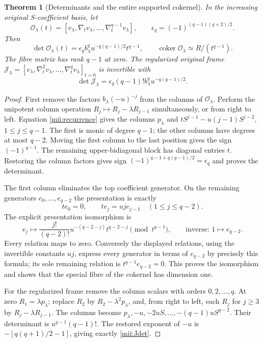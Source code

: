 \documentclass[11pt]{article}
\newtheorem{theorem}{Theorem}
\newcommand{\coker}{\operatorname{coker}}
\begin{document}
\begin{theorem}[Determinants and the entire supported cokernel]
In the increasing original $S$-coefficient basis, let
\[
 \mathcal O_\lambda(t)=[v_\lambda,\nabla_t v_\lambda,
                  \ldots,\nabla_t^{q-1}v_\lambda],
 \qquad\epsilon_q=(-1)^{(q-1)(q+2)/2}.
\]
Then
\begin{equation}\tag{MII19}\label{mii:Odet}
 \det\mathcal O_\lambda(t)
   =\epsilon_q b_\lambda^q u^{-q(q-1)/2}t^{q-1},
 \qquad\coker\mathcal O_\lambda\simeq R/(t^{q-1}).
\end{equation}
The fibre matrix has rank $q-1$ at zero. The regularized original
frame
$\mathcal J_\lambda=[v_\lambda,\nabla_t^2v_\lambda,
\ldots,\nabla_t^qv_\lambda]_{t=0}$ is invertible with
\begin{equation}\tag{MII20}\label{mii:Jdet}
 \det\mathcal J_\lambda
    =\epsilon_q(q-1)!b_\lambda^q u^{-q(q-1)/2}.
\end{equation}
\end{theorem}
\begin{proof}
First remove the factors $b_\lambda(-u)^{-j}$ from the columns
of $\mathcal O_\lambda$. Perform the unipotent column operation
$R_j\mapsto R_j-\lambda R_{j-1}$ simultaneously, or from right
to left. Equation \eqref{mii:recurrence} gives the columns
$p_\lambda$ and $tS^{j-1}-u(j-1)S^{j-2}$, $1\le j\le q-1$.
The first is monic of degree $q-1$; the other columns have degrees
at most $q-2$. Moving the first column to the last position gives
the sign $(-1)^{q-1}$. The remaining upper-bidiagonal block has
diagonal entries $t$. Restoring the column factors gives sign
$(-1)^{q-1+q(q-1)/2}=\epsilon_q$ and proves the determinant.

The first column eliminates the top coefficient generator. On the
remaining generators $e_0,\ldots,e_{q-2}$ the presentation is exactly
\[
 te_0=0,\qquad te_j=u j e_{j-1}\quad(1\le j\le q-2).
\]
The explicit presentation isomorphism is
\begin{equation}\tag{MII21}\label{mii:cokeriso}
 e_j\longmapsto
 \frac{j!}{(q-2)!}u^{-(q-2-j)}t^{q-2-j}\pmod{t^{q-1}},
 \qquad\text{inverse: }1\longmapsto e_{q-2}.
\end{equation}
Every relation maps to zero. Conversely the displayed relations,
using the invertible constants $uj$, express every generator in
terms of $e_{q-2}$ by precisely this formula; its sole remaining
relation is $t^{q-1}e_{q-2}=0$. This proves the isomorphism and
shows that the special fibre of the cokernel has dimension one.

For the regularized frame remove the column scalars with orders
$0,2,\ldots,q$. At zero $R_1=\lambda p_\lambda$; replace
$R_2$ by $R_2-\lambda^2p_\lambda$, and, from right to left, each
$R_j$ for $j\ge3$ by $R_j-\lambda R_{j-1}$. The columns become
$p_\lambda,-u,-2uS,\ldots,-(q-1)uS^{q-2}$. Their determinant
is $u^{q-1}(q-1)!$. The restored exponent of $-u$ is
$-[q(q+1)/2-1]$, giving exactly \eqref{mii:Jdet}.
\end{proof}
\end{document}
